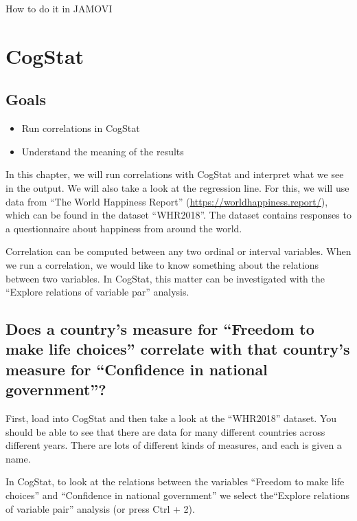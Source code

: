 \documentclass[
]{book}
\begin{document}
How to do it in JAMOVI

\hypertarget{cogstat-4}{%
\section{CogStat}\label{cogstat-4}}

\hypertarget{goals-2}{%
\subsection{Goals}\label{goals-2}}

\begin{itemize}
\item
  Run correlations in CogStat
\item
  Understand the meaning of the results
\end{itemize}

In this chapter, we will run correlations with CogStat and interpret what we see in the output. We will also take a look at the regression line. For this, we will use data from ``The World Happiness Report'' (\url{https://worldhappiness.report/}), which can be found in the dataset ``WHR2018''. The dataset contains responses to a questionnaire about happiness from around the world.

Correlation can be computed between any two ordinal or interval variables. When we run a correlation, we would like to know something about the relations between two variables. In CogStat, this matter can be investigated with the ``Explore relations of variable par'' analysis.

\hypertarget{does-a-countrys-measure-for-freedom-to-make-life-choices-correlate-with-that-countrys-measure-for-confidence-in-national-government}{%
\subsection{Does a country's measure for ``Freedom to make life choices'' correlate with that country's measure for ``Confidence in national government''?}\label{does-a-countrys-measure-for-freedom-to-make-life-choices-correlate-with-that-countrys-measure-for-confidence-in-national-government}}

First, load into CogStat and then take a look at the ``WHR2018'' dataset. You should be able to see that there are data for many different countries across different years. There are lots of different kinds of measures, and each is given a name.

In CogStat, to look at the relations between the variables ``Freedom to make life choices'' and ``Confidence in national government'' we select the``Explore relations of variable pair'' analysis (or press Ctrl + 2).
\end{document}
